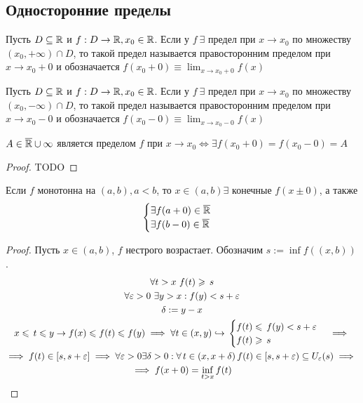 \subsection{Односторонние пределы}
\begin{definition}
	Пусть $ D \subseteq \mathbb{R} $ и $ f: D \to  \mathbb{R}, x_0 \in \mathbb{R} $. Если у $ f\ \exists  $ предел при $ x \to x_0 $ по множеству $ (x_0, +\infty)\cap D $,
	то такой предел называется правосторонним пределом при $ x \to x_0 + 0 $ и обозначается $ f(x_0 + 0) \equiv \lim_{x \to x_0 + 0} f(x)$
\end{definition}
\begin{definition}
	Пусть $ D \subseteq \mathbb{R} $ и $ f: D \to  \mathbb{R}, x_0 \in \mathbb{R} $. Если у $ f\ \exists  $ предел при $ x \to x_0 $ по множеству $ (x_0, -\infty)\cap D $,
	то такой предел называется правосторонним пределом при $ x \to x_0 - 0 $ и обозначается $ f(x_0 - 0) \equiv \lim_{x \to x_0 - 0} f(x)$
\end{definition}
\begin{proposition}
	 $ A \in \overline{\mathbb{R}} \cup {\infty} $ является пределом $ f $ при $ x \to x_0 \Longleftrightarrow \exists  f(x_0 + 0) = f(x_0 - 0) = A$
\end{proposition}
\begin{proof}
	TODO
\end{proof}
\begin{theorem}
	Если $ f $ монотонна на $ (a, b), a < b $, то $ x \in  (a, b) \exists \text{ конечные } f(x\pm 0)$, а также \begin{gather}
		\begin{cases} \exists f(a + 0) \in \overline{\mathbb{R}} \\
		\exists f(b - 0 ) \in \overline{\mathbb{R}}\end{cases} 
	\end{gather}
\end{theorem} \begin{proof}
	Пусть $ x \in (a, b) $, $ f $ нестрого возрастает. Обозначим $ s:= \inf f((x, b)) $. \begin{gather}
		\forall t > x \ f(t) \geqslant\, s \\ 
		\forall \varepsilon > 0 \ \exists y > x: f(y) < s + \varepsilon \\
		\delta : = y - x \\
		x \leqslant\, t \leqslant y \to f(x) \leqslant f(t) \leqslant f(y) \implies \forall t \in (x, y)\hookrightarrow\,\begin{cases}   f(t) \leqslant\,f(y) < s + \varepsilon \\
		f(t) \geqslant\, s \end{cases} \implies \\
		 \implies f(t) \in [s, s + \varepsilon] \implies \forall \varepsilon > 0 \exists \delta > 0 : \forall\, t \in (x, x + \delta)\, f(t) \in [s, s + \varepsilon) \subseteq U_{\varepsilon}(s) \implies\, \\ 
		 \implies f(x + 0) = \inf_{t > x}f(t)
	\end{gather}
\end{proof}
